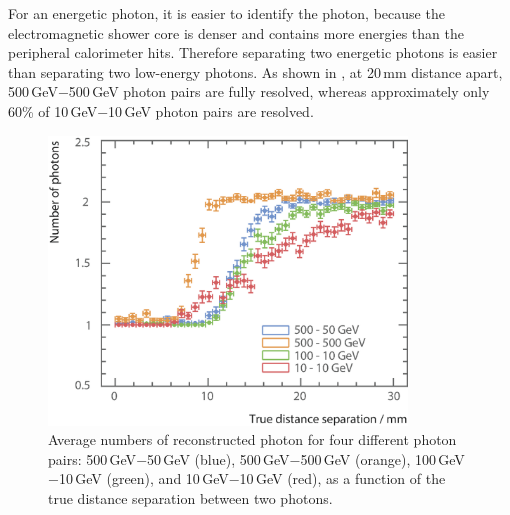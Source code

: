 For an energetic photon, it is easier to identify the photon, because the electromagnetic shower core is denser and contains more energies than the peripheral calorimeter hits. Therefore separating two energetic photons is easier than separating two low-energy photons. As shown in , at 20\,mm distance apart, 500\,GeV$-$500\,GeV photon pairs are fully resolved, whereas approximately only 60\% of 10\,GeV$-$10\,GeV photon pairs are resolved.

\begin{figure}[tbph]
\centering
        \includegraphics[width=0.85\textwidth]{photon/DoubleCompareEnergies2}
        \caption{Average numbers of reconstructed photon for four different photon pairs: 500\,GeV$-$50\,GeV (blue), 500\,GeV$-$500\,GeV (orange), 100\,GeV$-$10\,GeV (green), and 10\,GeV$-$10\,GeV (red), as a function of the true distance separation between two photons.}
        \label{fig:photonDoubleCompareEnergies}
\end{figure}

